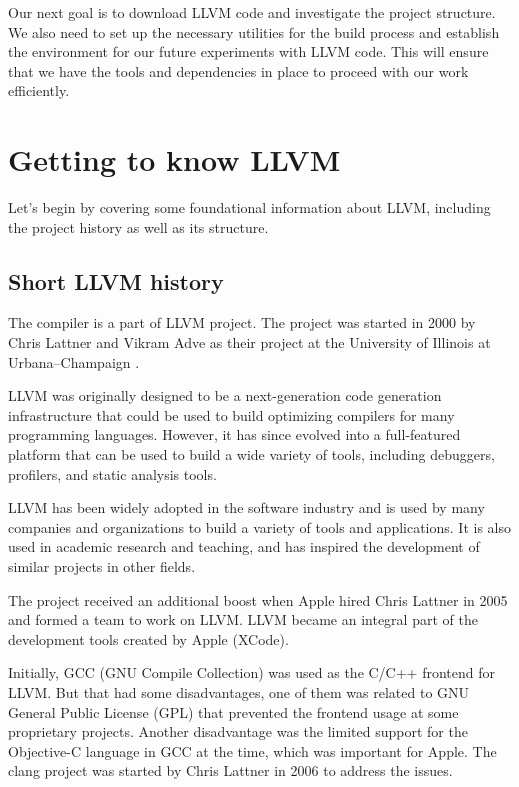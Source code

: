 Our next goal is to download LLVM code and investigate the project structure. We
also need to set up the necessary utilities for the build process and establish
the environment for our future experiments with LLVM code. This will ensure that
we have the tools and dependencies in place to proceed with our work
efficiently. 

\section{Getting to know LLVM}

Let's begin by covering some foundational information about LLVM, including the
project history as well as its structure. 

\subsection{Short LLVM history}
The \clang compiler is a part of LLVM project. The project was started in 2000
by Chris Lattner and Vikram 
Adve as their project at the University of Illinois at Urbana–Champaign
\citep{LLVM:CGO04}. 

LLVM was originally designed to be a next-generation code generation
infrastructure that could be used to build optimizing compilers for many
programming languages. However, it has since evolved into a full-featured
platform that can be used to build a wide variety of tools, including debuggers,
profilers, and static analysis tools.

LLVM has been widely adopted in the software industry and is used by many
companies and organizations to build a variety of tools and applications. It is
also used in academic research and teaching, and has inspired the development of
similar projects in other fields.

The project received an additional boost when Apple hired Chris Lattner in 2005
and formed a team to work on LLVM. LLVM became an integral part of the
development tools created by Apple (XCode).  

Initially, GCC (GNU Compile Collection) was used as the C/C++ frontend for
LLVM. But that had some disadvantages, one of them was related to GNU General Public
License (GPL)
that prevented the frontend usage at some proprietary projects. Another
disadvantage was the limited support for the Objective-C language in GCC at the
time, which was important for Apple. The clang project was started by Chris
Lattner in 2006 to address the issues.

